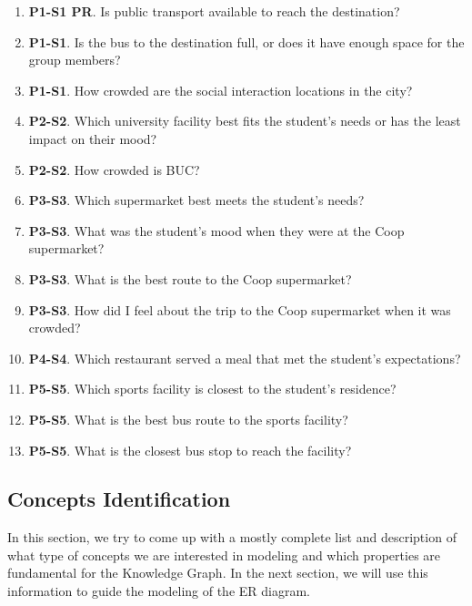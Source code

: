 \begin{enumerate}
    \item \textbf{P1-S1 PR}. Is public transport available to reach the destination?
    \item \textbf{P1-S1}. Is the bus to the destination full, or does it have enough space for the group members?
    \item \textbf{P1-S1}. How crowded are the social interaction locations in the city?
    \item \textbf{P2-S2}. Which university facility best fits the student's needs or has the least impact on their mood?
    \item \textbf{P2-S2}. How crowded is BUC?
    \item \textbf{P3-S3}. Which supermarket best meets the student's needs?
    \item \textbf{P3-S3}. What was the student's mood when they were at the Coop supermarket?
    \item \textbf{P3-S3}. What is the best route to the Coop supermarket?
    \item \textbf{P3-S3}. How did I feel about the trip to the Coop supermarket when it was crowded?
    \item \textbf{P4-S4}. Which restaurant served a meal that met the student's expectations?
    \item \textbf{P5-S5}. Which sports facility is closest to the student's residence?
    \item \textbf{P5-S5}. What is the best bus route to the sports facility?
    \item \textbf{P5-S5}. What is the closest bus stop to reach the facility?


\end{enumerate}

\subsection{Concepts Identification}
In this section, we try to come up with a mostly complete list and description of what type of concepts we are interested in modeling and which properties are fundamental for the Knowledge Graph.
In the next section, we will use this information to guide the modeling of the ER diagram.

